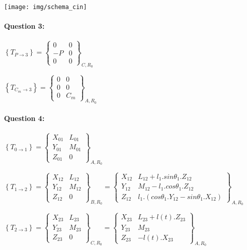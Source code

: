 \begin{center}
 \texttt{[image: img/schema\_cin]}
\end{center}

\paragraph{Question 3:}

$\left\{T_{P\rightarrow 3}\right\}=\left\{\begin{array}{cc}
0 & 0 \\
-P & 0 \\
0 & 0
\end{array}\right\}_{C,R_0}$

$\left\{T_{C_m\rightarrow 3}\right\}=\left\{\begin{array}{cc}
0 & 0 \\
0 & 0 \\
0 & C_m
\end{array}\right\}_{A,R_0}$

\paragraph{Question 4:}

$\left\{T_{0\rightarrow 1}\right\}=\left\{\begin{array}{cc}
X_{01} & L_{01} \\
Y_{01} & M_{01} \\
Z_{01} & 0
\end{array}\right\}_{A,R_0}$

$\left\{T_{1\rightarrow 2}\right\}=\left\{\begin{array}{cc}
X_{12} & L_{12} \\
Y_{12} & M_{12} \\
Z_{12} & 0
\end{array}\right\}_{B,R_0}=\left\{\begin{array}{cc}
X_{12} & L_{12}+l_1.sin\theta_1.Z_{12} \\
Y_{12} & M_{12}-l_1.cos\theta_1.Z_{12} \\
Z_{12} & l_1.(cos\theta_1.Y_{12}-sin\theta_1.X_{12})
\end{array}\right\}_{A,R_0}$

$\left\{T_{2\rightarrow 3}\right\}=\left\{\begin{array}{cc}
X_{23} & L_{23} \\
Y_{23} & M_{23} \\
Z_{23} & 0
\end{array}\right\}_{C,R_0}=\left\{\begin{array}{cc}
X_{23} & L_{23}+l(t).Z_{23} \\
Y_{23} & M_{23} \\
Z_{23} & -l(t).X_{23}
\end{array}\right\}_{A,R_0}$

